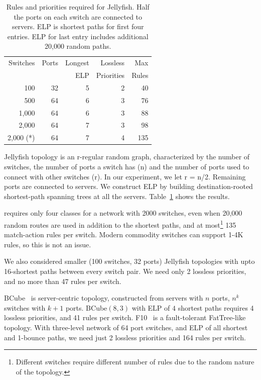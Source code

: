 \begin{table}[t]
		\footnotesize
	\centering
		\begin{tabular}{|r|r|r|r|r|}
			\hline
				Switches & Ports & Longest & Lossless & Max \\
						 &		 & ELP & Priorities & Rules \\
			\hline
			\hline
			100 & 32 & 5 & 2 &  40 \\
			\hline
			500 & 64 & 6 & 3 & 76 \\
			\hline
			1,000 & 64 & 6 & 3 & 88 \\
			\hline
			2,000 & 64 & 7 & 3 & 98 \\
			\hline
			2,000 (*)  & 64 & 7 & 4 &  135\\
			\hline
			
		\end{tabular}
		\caption{Rules and priorities required for Jellyfish. Half the ports on
		each switch are connected to servers. ELP is shortest paths for first four entries. ELP for last entry includes additional 20,000 random paths.}
\label{table:jellyfish_shortestpath} \end{table}

Jellyfish topology is an r-regular random graph, characterized by the number of
switches, the number of ports a switch has (n) and the number of ports used to
connect with other switches (r).  In our experiment, we let r = n/2. Remaining
ports are connected to servers. We construct ELP by building destination-rooted
shortest-path spanning trees at all the servers.
Table~\ref{table:jellyfish_shortestpath} shows the results.

\sysname{} requires only four classes for a network with 2000 switches, even
when 20,000 random routes are used in addition to the shortest paths, and at
most\footnote{Different switches require different number of rules due to the
random nature of the topology.} 135 match-action rules per switch.  Modern
commodity switches can support 1-4K rules, so this is not an issue.

We also considered smaller (100 switches, 32 ports) Jellyfish
topologies with upto 16-shortest paths between every switch pair. 
We need only 2 lossless priorities, and no more than 47 rules per switch.

BCube~\cite{bcube} is server-centric topology, constructed from servers with $n$
ports, $n^k$ switches with $k+1$ ports. BCube$(8,3)$ with ELP of $4$ shortest
paths requires 4 lossless priorities, and 41 rules per switch.
F10~\cite{f10} is a fault-tolerant FatTree-like topology.  With three-level
network of 64 port switches, and ELP of all shortest and 1-bounce paths, we need
just 2 lossless priorities and 164 rules per switch.

